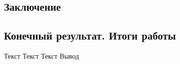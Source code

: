 \newpage
\begin{center}
	\section{Заключение}
	\end{center}

\subsection{Конечный результат. Итоги работы}

 Текст
	\newline
	\newline
Текст
	\newline
	\newline
Текст
	\newline
	\newline
Вывод